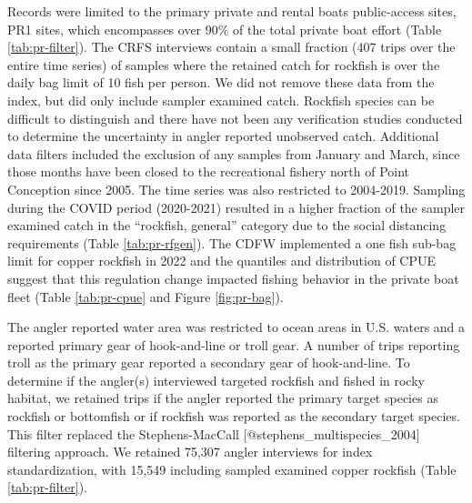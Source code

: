 \documentclass[11pt,
  letterpaper,
]{article}
\begin{document}
Records were limited to the primary private and rental boats public-access sites, PR1 sites, which encompasses over 90\% of the total private boat effort (Table \ref{tab:pr-filter}). The CRFS interviews contain a small fraction (407 trips over the entire time series) of samples where the retained catch for rockfish is over the daily bag limit of 10 fish per person. We did not remove these data from the index, but did only include sampler examined catch. Rockfish species can be difficult to distinguish and there have not been any verification studies conducted to determine the uncertainty in angler reported unobserved catch. Additional data filters included the exclusion of any samples from January and March, since those months have been closed to the recreational fishery north of Point Conception since 2005. The time series was also restricted to 2004-2019. Sampling during the COVID period (2020-2021) resulted in a higher fraction of the sampler examined catch in the ``rockfish, general'' category due to the social distancing requirements (Table \ref{tab:pr-rfgen}). The CDFW implemented a one fish sub-bag limit for copper rockfish in 2022 and the quantiles and distribution of CPUE suggest that this regulation change impacted fishing behavior in the private boat fleet (Table \ref{tab:pr-cpue} and Figure \ref{fig:pr-bag}).

The angler reported water area was restricted to ocean areas in U.S. waters and a reported primary gear of hook-and-line or troll gear. A number of trips reporting troll as the primary gear reported a secondary gear of hook-and-line. To determine if the angler(s) interviewed targeted rockfish and fished in rocky habitat, we retained trips if the angler reported the primary target species as rockfish or bottomfish or if rockfish was reported as the secondary target species. This filter replaced the Stephens-MacCall {[}@stephens\_multispecies\_2004{]} filtering approach. We retained 75,307 angler interviews for index standardization, with 15,549 including sampled examined copper rockfish (Table \ref{tab:pr-filter}).
\end{document}
